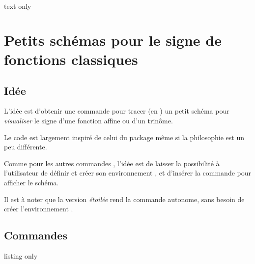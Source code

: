 \begin{PresCodeTexPL}{text only}
\end{PresCodeTexPL}

\newpage

\section{Petits schémas pour le signe de fonctions classiques}\label{aidesigne}

\subsection{Idée}

\begin{tipblock}
L'idée est d'obtenir une commande pour tracer (en \TikZ) un petit schéma pour \textit{visualiser} le signe d'une fonction affine ou d'un trinôme.

Le code est largement inspiré de celui du package  même si la philosophie est un peu différente.

\smallskip

Comme pour les autres commandes \TikZ, l'idée est de laisser la possibilité à l'utilisateur de définir et créer son environnement \TikZ, et d'insérer la commande  pour afficher le schéma.

\smallskip

 Il est à noter que la version \textit{étoilée} rend la commande autonome, sans besoin de créer l'environnement \TikZ.
\end{tipblock}

\begin{PresCodePL}{}
\MiniSchemaSignes*
\end{PresCodePL}

\subsection{Commandes}

\begin{PresCodeTexPL}{listing only}
\begin{tikzpicture}[<options>]
	\MiniSchemaSignes[clés]
\end{tikzpicture}
\end{PresCodeTexPL}

